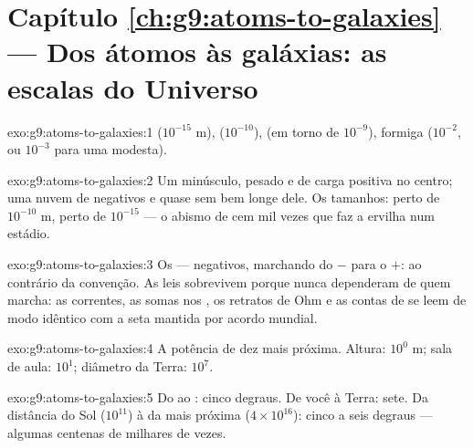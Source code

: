 \section*{Capítulo \ref{ch:g9:atoms-to-galaxies} --- Dos átomos às galáxias: as escalas do Universo}

\begin{solution}{exo:g9:atoms-to-galaxies:1}
 ($10^{-15}$ \unit{m}),  ($10^{-10}$),  (em torno
de $10^{-9}$), formiga ($10^{-2}$, ou $10^{-3}$ para uma modesta).
\end{solution}

\begin{solution}{exo:g9:atoms-to-galaxies:2}
Um  minúsculo, pesado e de carga positiva no centro; uma nuvem
de  negativos e quase sem  bem longe dele. Os tamanhos:
 perto de $10^{-10}$ \unit{m},  perto de $10^{-15}$ --- o
abismo de cem mil vezes que faz a ervilha num estádio.
\end{solution}

\begin{solution}{exo:g9:atoms-to-galaxies:3}
Os  --- negativos, marchando do $-$ para o $+$: ao contrário
da convenção. As leis sobrevivem porque nunca dependeram de quem
marcha: as correntes, as somas nos , os retratos de Ohm e as
contas de  se leem de modo idêntico com a seta mantida por acordo
mundial.
\end{solution}

\begin{solution}{exo:g9:atoms-to-galaxies:4}
A potência de dez mais próxima. Altura: $10^{0}$ \unit{m}; sala de
aula: $10^{1}$; diâmetro da Terra: $10^{7}$.
\end{solution}

\begin{solution}{exo:g9:atoms-to-galaxies:5}
Do  ao : cinco degraus. De você à Terra: sete. Da
distância do Sol ($10^{11}$) à da  mais próxima
($4 \times 10^{16}$): cinco a seis degraus --- algumas centenas de
milhares de vezes.
\end{solution}

